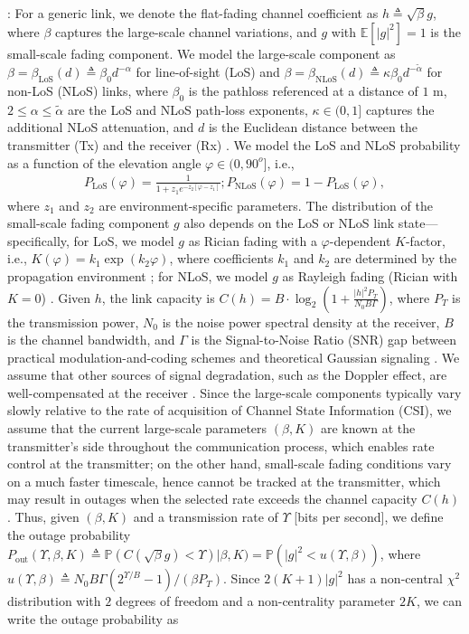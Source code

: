 \documentclass[10pt,twocolumn]{IEEEtran}
\begin{document}
: For a generic link, we denote the flat-fading channel coefficient as $h{\triangleq}\sqrt{\beta}g$, where $\beta$ captures the large-scale channel variations, and $g$ with $\mathbb{E}\left[|g|^2\right]{=}1$ is the small-scale fading component. We model the large-scale component as $\beta{=}\beta_{\mathrm{LoS}}(d){\triangleq}\beta_{0}d^{-\alpha}$ for line-of-sight (LoS) and $\beta{=}\beta_{\mathrm{NLoS}}(d){\triangleq}\kappa\beta_{0}d^{-\tilde{\alpha}}$ for non-LoS (NLoS) links, where $\beta_{0}$ is the pathloss referenced at a distance of $1$ m, $2{\leq}\alpha{\leq}\tilde{\alpha}$ are the LoS and NLoS path-loss exponents, $\kappa{\in}(0,1]$ captures the additional NLoS attenuation, and $d$ is the Euclidean distance between the transmitter (Tx) and the receiver (Rx) \cite{SCA}. We model the LoS and NLoS probability as a function of the elevation angle $\varphi{\in}(0,90^{o}]$, i.e., 
\begin{align}\label{eq:PLoS}
	P_{\mathrm{LoS}}(\varphi){=}\frac{1}{1{+}z_{1}e^{{-}z_{2}[\varphi{-}z_{1}]}};P_{\mathrm{NLoS}}(\varphi){=}1{-}P_{\mathrm{LoS}}(\varphi),
\end{align}
where $z_{1}$ and $z_{2}$ are environment-specific parameters. The distribution of the small-scale fading component $g$ also depends on the LoS or NLoS link state---specifically, for LoS, we model $g$ as Rician fading with a $\varphi$-dependent $K$-factor, i.e., $K(\varphi){=}k_{1}\exp\left(k_{2}\varphi\right)$, where coefficients $k_{1}$ and $k_{2}$ are determined by the propagation environment \cite{Rician}; for NLoS, we model $g$ as Rayleigh fading (Rician with $K{=}0$) \cite{Rician}. Given $h$, the link capacity is $C(h){=}B{\cdot}\log_{2}\left(1{+}\frac{|h|^{2}P_{T}}{N_{0}B\Gamma} \right)$, where $P_{T}$ is the transmission power, $N_{0}$ is the noise power spectral density at the receiver, $B$ is the channel bandwidth, and $\Gamma$ is the Signal-to-Noise Ratio (SNR) gap between practical modulation-and-coding schemes and theoretical Gaussian signaling \cite{Rician}. We assume that other sources of signal degradation, such as the Doppler effect, are well-compensated at the receiver \cite{Doppler}. Since the large-scale components typically vary slowly relative to the rate of acquisition of Channel State Information (CSI), we assume that the current large-scale parameters $(\beta,K)$ are known at the transmitter's side throughout the communication process, which enables rate control at the transmitter; on the other hand, small-scale fading conditions vary on a much faster timescale, hence cannot be tracked at the transmitter, which may result in outages when the selected rate exceeds the channel capacity $C(h)$. Thus, given $(\beta,K)$ and a transmission rate of $\Upsilon$ [bits per second], we define the outage probability $P_{\mathrm{out}}(\Upsilon,\beta,K) \triangleq \mathbb{P}(C(\sqrt{\beta}g){<}\Upsilon)|\beta,K) = \mathbb{P}\left(|g|^{2}{<}u(\Upsilon,\beta)\right)$, where $u(\Upsilon,\beta){\triangleq}N_{0}B\Gamma(2^{\Upsilon/B}{-}1)/(\beta P_{T})$. Since $2(K{+}1)|g|^{2}$ has a non-central $\chi^2$ distribution with $2$ degrees of freedom and a non-centrality parameter $2K$, we can write the outage probability as
\end{document}
